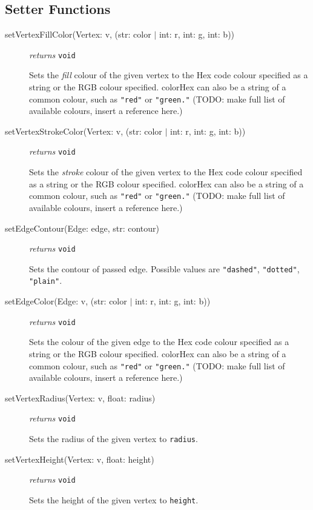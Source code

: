 \documentclass{article}
\begin{document}
\subsection{Setter Functions}
\begin{description}
\item[setVertexFillColor(Vertex: v, (str: color $|$ int: r, int: g, int:
  b))] \emph{returns} \texttt{void}

Sets the \textit{fill} colour of the given vertex to the Hex code colour
specified as a string or the RGB colour specified. colorHex can also be
a string of a common colour, such as \texttt{"red"} or
\texttt{"green."}  (TODO: make full list of available colours, insert
a reference here.)

\item[setVertexStrokeColor(Vertex: v, (str: color $|$ int: r, int: g, int:
  b))] \emph{returns} \texttt{void}

  Sets the \textit{stroke} colour of the given vertex to the Hex code colour
specified as a string or the RGB colour specified. colorHex can also be
a string of a common colour, such as \texttt{"red"} or
\texttt{"green."}  (TODO: make full list of available colours, insert
a reference here.)

\item[setEdgeContour(Edge: edge, str: contour)] \emph{returns}
\texttt{void}

Sets the contour of passed edge. Possible values are
\texttt{"dashed"}, \texttt{"dotted"}, \texttt{"plain"}.

\item[setEdgeColor(Edge: v, (str: color $|$ int: r, int: g, int:
  b))] \emph{returns} \texttt{void}

  Sets the colour of the given edge to the Hex code colour
specified as a string or the RGB colour specified. colorHex can also be
a string of a common colour, such as \texttt{"red"} or
\texttt{"green."}  (TODO: make full list of available colours, insert
a reference here.)

\item[setVertexRadius(Vertex: v, float: radius)] \emph{returns}
  \texttt{void}

Sets the radius of the given vertex to \texttt{radius}.

\item[setVertexHeight(Vertex: v, float: height)] \emph{returns}
  \texttt{void}

Sets the height of the given vertex to \texttt{height}.


\end{description}
\end{document}
